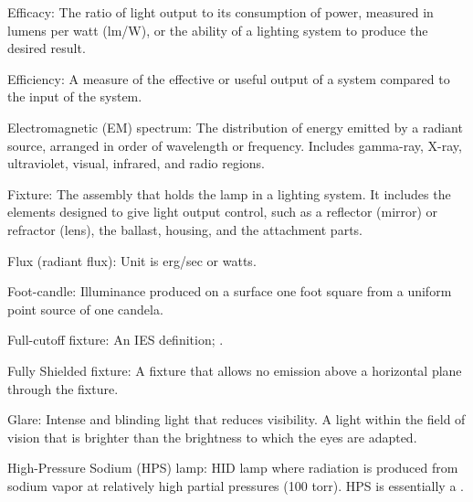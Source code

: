\documentclass[12pt, oneside]{article}
\begin{document}
Efficacy: The ratio of light output to its consumption of power, measured in lumens per watt (lm/W), or the ability of a lighting system to produce the desired result.

Efficiency: A measure of the effective or useful output of a system compared to the input of the system.

Electromagnetic (EM) spectrum: The distribution of energy emitted by a radiant source, arranged in order of wavelength or frequency. Includes gamma-ray, X-ray, ultraviolet, visual, infrared, and radio regions.


Fixture: The assembly that holds the lamp in a lighting system. It includes the elements designed to give light output control, such as a reflector (mirror) or refractor (lens), the ballast, housing, and the attachment parts.



Flux (radiant flux): Unit is erg/sec or watts.

Foot-candle: Illuminance produced on a surface one foot square from a uniform point source of one candela.


Full-cutoff fixture: An IES definition; .

Fully Shielded fixture: A fixture that allows no emission above a horizontal plane through the fixture.

Glare: Intense and blinding light that reduces visibility. A light within the field of vision that is brighter than the brightness to which the eyes are adapted.

High-Pressure Sodium (HPS) lamp: HID lamp where radiation is produced from sodium vapor at relatively high partial pressures (100 torr). HPS is essentially a .

\end{document}
